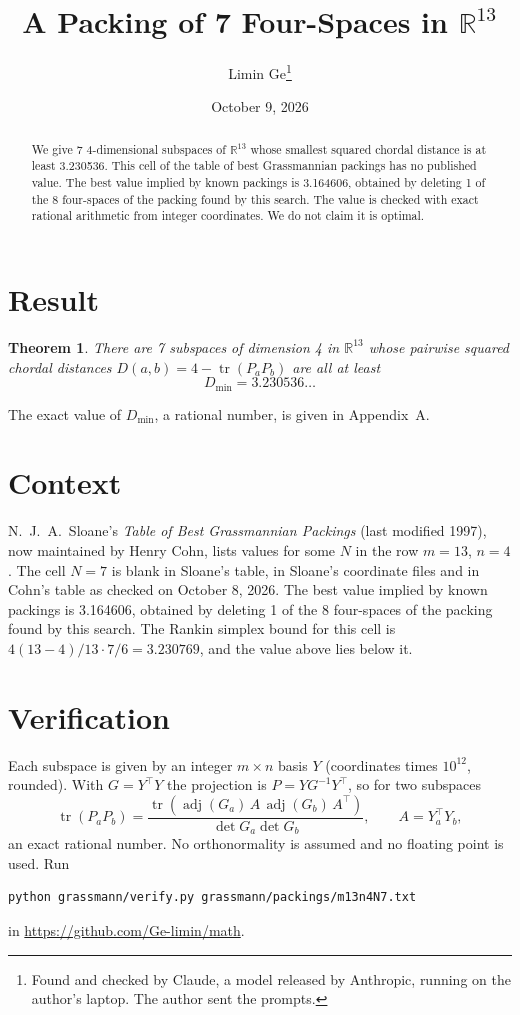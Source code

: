 \documentclass[11pt,a4paper]{article}
\title{A Packing of 7 Four-Spaces in $\mathbb{R}^{13}$}
\author{Limin Ge\thanks{Found and checked by Claude, a model released by Anthropic, running on the author's laptop. The author sent the prompts.}}
\date{October 9, 2026}
\newtheorem*{theorem}{Theorem}
\begin{document}
\maketitle
\begin{abstract}
We give 7 4-dimensional subspaces of $\mathbb{R}^{13}$ whose smallest squared chordal distance is at least 3.230536. This cell of the table of best Grassmannian packings has no published value. The best value implied by known packings is 3.164606, obtained by deleting 1 of the 8 four-spaces of the packing found by this search. The value is checked with exact rational arithmetic from integer coordinates. We do not claim it is optimal.
\end{abstract}

\section{Result}
\begin{theorem}
There are 7 subspaces of dimension 4 in $\mathbb{R}^{13}$ whose pairwise squared chordal distances $D(a,b) = 4 - \operatorname{tr}(P_aP_b)$ are all at least
\[ D_{\min} = 3.230536\ldots \]
\end{theorem}
The exact value of $D_{\min}$, a rational number, is given in Appendix~A.


\section{Context}
N.~J.~A.~Sloane's \emph{Table of Best Grassmannian Packings} (last modified 1997), now maintained by Henry Cohn, lists values for some $N$ in the row $m=13$, $n=4$. The cell $N=7$ is blank in Sloane's table, in Sloane's coordinate files and in Cohn's table as checked on October 8, 2026. The best value implied by known packings is 3.164606, obtained by deleting 1 of the 8 four-spaces of the packing found by this search. The Rankin simplex bound for this cell is $4(13-4)/13\cdot 7/6 = 3.230769$, and the value above lies below it.


\section{Verification}
Each subspace is given by an integer $m\times n$ basis $Y$ (coordinates times $10^{12}$, rounded). With $G=Y^\top Y$ the projection is $P=YG^{-1}Y^\top$, so for two subspaces
\[ \operatorname{tr}(P_aP_b)=\frac{\operatorname{tr}(\operatorname{adj}(G_a)\,A\,\operatorname{adj}(G_b)\,A^\top)}{\det G_a\det G_b},\qquad A=Y_a^\top Y_b, \]
an exact rational number. No orthonormality is assumed and no floating point is used. Run
\begin{verbatim}
python grassmann/verify.py grassmann/packings/m13n4N7.txt
\end{verbatim}
in \url{https://github.com/Ge-limin/math}.
\end{document}
